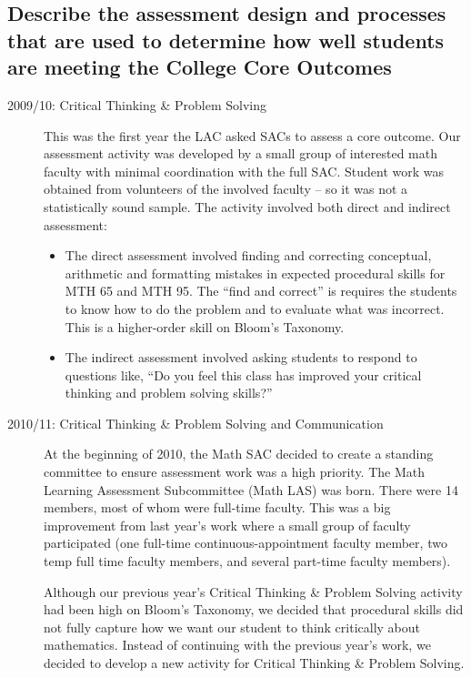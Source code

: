 \subsection{Describe the assessment design and processes that are used to determine how well students are meeting the College Core Outcomes}

\begin{description}
\item [2009/10: Critical Thinking  \& Problem Solving]

This was the first year the LAC asked SACs to assess a core outcome. Our assessment activity was developed by a small group of interested math faculty with minimal coordination with the full SAC. Student work was obtained from volunteers of the involved faculty -- so it was not a statistically sound sample.  The activity involved both direct and indirect assessment: 
\begin{itemize}
\item The direct assessment involved finding and correcting conceptual, arithmetic and formatting mistakes in expected procedural skills for MTH 65 and MTH 95.  The ``find and correct'' is requires the students to know how to do the problem and to evaluate what was incorrect.  This is a higher-order skill on Bloom's Taxonomy. 

\item The indirect assessment involved asking students to respond to questions like, ``Do you feel this class has improved your critical thinking and problem solving skills?''
\end{itemize}

\item[2010/11:  Critical Thinking \& Problem Solving and Communication]

At the beginning of 2010, the Math SAC decided to create a standing committee to ensure assessment work was a high priority. The Math Learning Assessment Subcommittee (Math LAS) was born.  There were 14 members, most of whom were full-time faculty. This was a big improvement from last year's work where a small group of faculty participated (one full-time continuous-appointment faculty member, two temp full time faculty members, and several part-time faculty members).

Although our previous year's Critical Thinking \& Problem Solving activity had been high on Bloom's Taxonomy, we decided that procedural skills did not fully capture how we want our student to think critically about mathematics.  Instead of continuing with the previous year's work, we decided to develop a new activity for Critical Thinking \& Problem Solving. 


\end{description}
